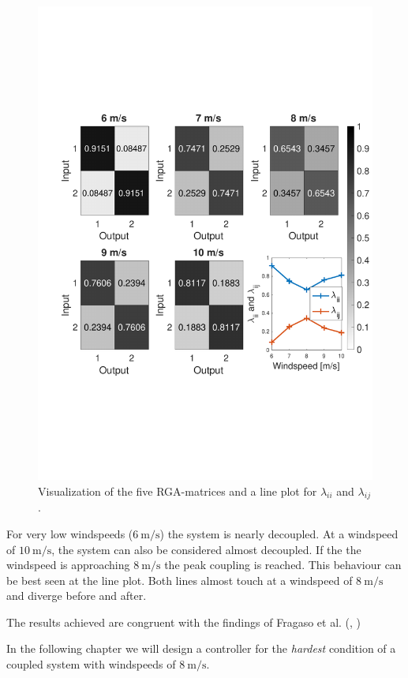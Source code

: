 \begin{figure}[H]
    \center
    \includegraphics[scale=0.6,trim=40 180 0 120,clip]{fig/RGA_results.pdf}
    \caption{Visualization of the five RGA-matrices and a line plot for $\lambda_{ii}$ and $\lambda_{ij}$.}
    \label{fig:analysis:RGA_results}
\end{figure}

For very low windspeeds ($\SI{6}{\metre\per\second}$) the system is nearly decoupled.
At a windspeed of $\SI{10}{\metre\per\second}$, the system can also be considered almost decoupled.
If the the windspeed is approaching $\SI{8}{\metre\per\second}$ the peak coupling is reached.
This behaviour can be best seen at the line plot.
Both lines almost touch at a windspeed of $\SI{8}{\metre\per\second}$ and diverge before and after.

The results achieved are congruent with the findings of Fragaso et al. (\cite[p. 7]{Fragoso_et_al_2017}, \cite[p. 123]{Fragoso_PhD_2016})

In the following chapter we will design a controller for the \textit{hardest} condition of a coupled system with windspeeds of $\SI{8}{\metre\per\second}$.
